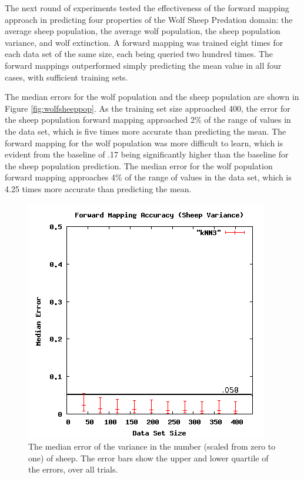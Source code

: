 The next round of experiments tested the effectiveness of the forward mapping approach in predicting four properties of the Wolf Sheep Predation domain: the average sheep population, the average wolf population, the sheep population variance, and wolf extinction.
A forward mapping was trained eight times for each data set of the same size, each being queried two hundred times.
The forward mappings outperformed simply predicting the mean value in all four cases, with sufficient training sets.

The median errors for the wolf population and the sheep population are shown in Figure \ref{fig:wolfsheeppop}.
As the training set size approached 400, the error for the sheep population forward mapping approached 2\% of the range of values in the data set, which is five times more accurate than predicting the mean.
The forward mapping for the wolf population was more difficult to learn, which is evident from the baseline of .17 being significantly higher than the baseline for the sheep population prediction.
The median error for the wolf population forward mapping approaches 4\% of the range of values in the data set, which is 4.25 times more accurate than predicting the mean.

\begin{figure}[ht]
\centering
\includegraphics[scale=.5]{images/results_wolfsheep/fm-sheep-var.png}
\caption{The median error of the variance in the number (scaled from zero to one) of sheep.
The error bars show the upper and lower quartile of the errors, over all trials.}
\label{fig:wolfsheepvar}
\end{figure}

